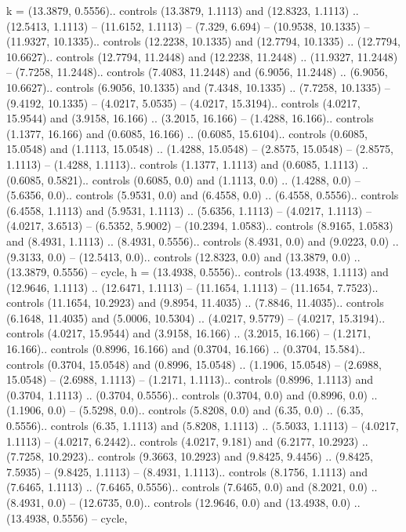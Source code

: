 {k} = {(13.3879, 0.5556).. controls (13.3879, 1.1113) and (12.8323, 1.1113) .. (12.5413, 1.1113) -- (11.6152, 1.1113) -- (7.329, 6.694) -- (10.9538, 10.1335) -- (11.9327, 10.1335).. controls (12.2238, 10.1335) and (12.7794, 10.1335) .. (12.7794, 10.6627).. controls (12.7794, 11.2448) and (12.2238, 11.2448) .. (11.9327, 11.2448) -- (7.7258, 11.2448).. controls (7.4083, 11.2448) and (6.9056, 11.2448) .. (6.9056, 10.6627).. controls (6.9056, 10.1335) and (7.4348, 10.1335) .. (7.7258, 10.1335) -- (9.4192, 10.1335) -- (4.0217, 5.0535) -- (4.0217, 15.3194).. controls (4.0217, 15.9544) and (3.9158, 16.166) .. (3.2015, 16.166) -- (1.4288, 16.166).. controls (1.1377, 16.166) and (0.6085, 16.166) .. (0.6085, 15.6104).. controls (0.6085, 15.0548) and (1.1113, 15.0548) .. (1.4288, 15.0548) -- (2.8575, 15.0548) -- (2.8575, 1.1113) -- (1.4288, 1.1113).. controls (1.1377, 1.1113) and (0.6085, 1.1113) .. (0.6085, 0.5821).. controls (0.6085, 0.0) and (1.1113, 0.0) .. (1.4288, 0.0) -- (5.6356, 0.0).. controls (5.9531, 0.0) and (6.4558, 0.0) .. (6.4558, 0.5556).. controls (6.4558, 1.1113) and (5.9531, 1.1113) .. (5.6356, 1.1113) -- (4.0217, 1.1113) -- (4.0217, 3.6513) -- (6.5352, 5.9002) -- (10.2394, 1.0583).. controls (8.9165, 1.0583) and (8.4931, 1.1113) .. (8.4931, 0.5556).. controls (8.4931, 0.0) and (9.0223, 0.0) .. (9.3133, 0.0) -- (12.5413, 0.0).. controls (12.8323, 0.0) and (13.3879, 0.0) .. (13.3879, 0.5556) -- cycle},
{h} = {(13.4938, 0.5556).. controls (13.4938, 1.1113) and (12.9646, 1.1113) .. (12.6471, 1.1113) -- (11.1654, 1.1113) -- (11.1654, 7.7523).. controls (11.1654, 10.2923) and (9.8954, 11.4035) .. (7.8846, 11.4035).. controls (6.1648, 11.4035) and (5.0006, 10.5304) .. (4.0217, 9.5779) -- (4.0217, 15.3194).. controls (4.0217, 15.9544) and (3.9158, 16.166) .. (3.2015, 16.166) -- (1.2171, 16.166).. controls (0.8996, 16.166) and (0.3704, 16.166) .. (0.3704, 15.584).. controls (0.3704, 15.0548) and (0.8996, 15.0548) .. (1.1906, 15.0548) -- (2.6988, 15.0548) -- (2.6988, 1.1113) -- (1.2171, 1.1113).. controls (0.8996, 1.1113) and (0.3704, 1.1113) .. (0.3704, 0.5556).. controls (0.3704, 0.0) and (0.8996, 0.0) .. (1.1906, 0.0) -- (5.5298, 0.0).. controls (5.8208, 0.0) and (6.35, 0.0) .. (6.35, 0.5556).. controls (6.35, 1.1113) and (5.8208, 1.1113) .. (5.5033, 1.1113) -- (4.0217, 1.1113) -- (4.0217, 6.2442).. controls (4.0217, 9.181) and (6.2177, 10.2923) .. (7.7258, 10.2923).. controls (9.3663, 10.2923) and (9.8425, 9.4456) .. (9.8425, 7.5935) -- (9.8425, 1.1113) -- (8.4931, 1.1113).. controls (8.1756, 1.1113) and (7.6465, 1.1113) .. (7.6465, 0.5556).. controls (7.6465, 0.0) and (8.2021, 0.0) .. (8.4931, 0.0) -- (12.6735, 0.0).. controls (12.9646, 0.0) and (13.4938, 0.0) .. (13.4938, 0.5556) -- cycle},
